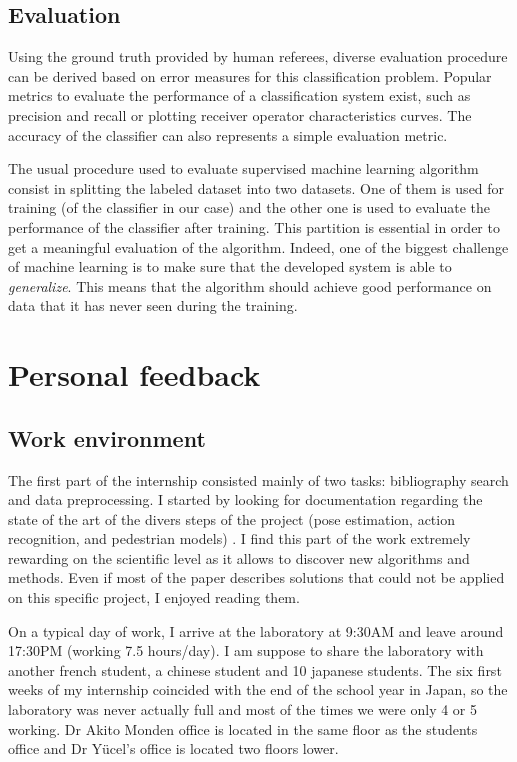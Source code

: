 \documentclass[12pt,a4paper,twoside]{article}
\begin{document}
\subsection{Evaluation}
Using the ground truth provided by human referees, diverse evaluation procedure can be derived based on error measures for this classification problem. Popular metrics to evaluate the performance of a classification system exist, such as precision and recall  or plotting receiver operator characteristics curves. The accuracy of the classifier can also represents a simple evaluation metric.

The usual procedure used to evaluate supervised machine learning algorithm consist in splitting the labeled dataset into two datasets. One of them is used for training (of the classifier in our case) and the other one is used to evaluate the performance of the classifier after training. This partition is essential in order to get a meaningful evaluation of the algorithm. Indeed, one of the biggest challenge of machine learning is to make sure that the developed system is able  to \textit{generalize}. This means that the algorithm should achieve good performance on data that it has never seen during the training.

\newpage

\section{Personal feedback}

\subsection{Work environment}
The first part of the internship consisted mainly of two tasks: bibliography search and data preprocessing. I started by looking for documentation regarding the state of the art of the divers steps of the project (pose estimation, action recognition, and pedestrian models)
. I find this part of the work extremely rewarding on the scientific level as it allows to discover new algorithms and methods. Even if most of the paper describes solutions that could not be applied on this specific project, I enjoyed reading them.

On a typical day of work, I arrive at the laboratory at 9:30AM and leave around 17:30PM (working 7.5 hours/day). I am suppose to share the laboratory with another french student, a chinese student and 10 japanese students. The six first weeks of my internship coincided with the end of the school year in Japan, so the laboratory was never actually full and most of the times we were only 4 or 5 working. Dr Akito Monden office is located in the same floor as the students office and Dr Yücel's office is located two floors lower. 
\end{document}
